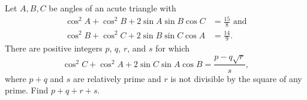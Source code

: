 Let $A,B,C$ be angles of an acute triangle with
\begin{align*}
\cos^2 A + \cos^2 B + 2 \sin A \sin B \cos C &= \frac{15}{8} \text{ and} \\
\cos^2 B + \cos^2 C + 2 \sin B \sin C \cos A &= \frac{14}{9}.
\end{align*}
There are positive integers $p$, $q$, $r$, and $s$ for which \[ \cos^2 C + \cos^2 A + 2 \sin C \sin A \cos B = \frac{p-q\sqrt{r}}{s}, \] where $p+q$ and $s$ are relatively prime and $r$ is not divisible by the square of any prime.  Find $p+q+r+s$.